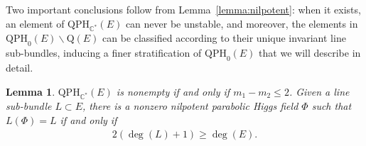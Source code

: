 \documentclass[pdftex]{sigma}
\newcommand{\field}[1]{\ensuremath{\mathbb{#1}}}
\newcommand{\CC}{\field{C}}
\numberwithin{equation}{section}
\newtheorem{Lemma}[Theorem]{Lemma}
\begin{document}
Two important conclusions follow from Lemma~\ref{lemma:nilpotent}: when it exists, an element of $\mathrm{QPH}_{\CC^{*}}(E)$ can never be unstable, and moreover, the elements in $\mathrm{QPH}_{0}(E)\backslash \mathrm{Q}(E)$ can be classified according to their unique invariant line sub-bundles, inducing a finer stratification of $\mathrm{QPH}_{0}(E)$ that we will describe in detail.

\begin{Lemma}\label{lemma:cases}
$\mathrm{QPH}_{\CC^{*}}(E)$ is nonempty if and only if $m_{1}-m_{2}\leq 2$. Given a line sub-bundle $L\subset E$, there is a nonzero nilpotent parabolic Higgs field $\Phi$ such that $L(\Phi)=L$ if and only if
\begin{gather}\label{eq:bound-deg(L)}
2(\deg(L)+1) \geq \deg (E).
\end{gather}
\end{Lemma}
\end{document}
